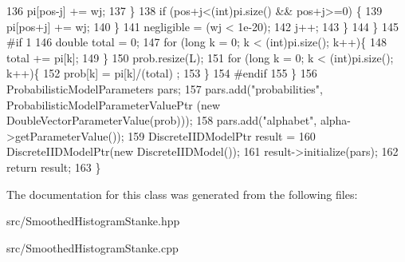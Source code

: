 \begin{DoxyCode}
136                   pi[pos-j] += wj;
137                 \}
138                 \textcolor{keywordflow}{if} (pos+j<(\textcolor{keywordtype}{int})pi.size() && pos+j>=0) \{
139                   pi[pos+j] += wj;
140                 \}
141                 negligible = (wj < 1e-20);
142                 j++;
143               \}
144             \}
145 \textcolor{preprocessor}{#if 1}
146         \textcolor{keywordtype}{double} total = 0;
147         \textcolor{keywordflow}{for} (\textcolor{keywordtype}{long} k = 0; k < (int)pi.size(); k++)\{
148             total += pi[k];
149         \}
150         prob.resize(L);
151         \textcolor{keywordflow}{for} (\textcolor{keywordtype}{long} k = 0; k < (int)pi.size(); k++)\{
152             prob[k] =  pi[k]/(total) ;
153         \}
154 \textcolor{preprocessor}{#endif}
155       \}
156     ProbabilisticModelParameters pars;
157     pars.add(\textcolor{stringliteral}{"probabilities"}, ProbabilisticModelParameterValuePtr (\textcolor{keyword}{new} DoubleVectorParameterValue(prob)));
158     pars.add(\textcolor{stringliteral}{"alphabet"}, alpha->getParameterValue());
159     DiscreteIIDModelPtr result =
160       DiscreteIIDModelPtr(\textcolor{keyword}{new} DiscreteIIDModel());
161     result->initialize(pars);
162     \textcolor{keywordflow}{return} result;
163   \}
\end{DoxyCode}


The documentation for this class was generated from the following files\+:\begin{DoxyCompactItemize}
\item 
src/Smoothed\+Histogram\+Stanke.\+hpp\item 
src/Smoothed\+Histogram\+Stanke.\+cpp\end{DoxyCompactItemize}
